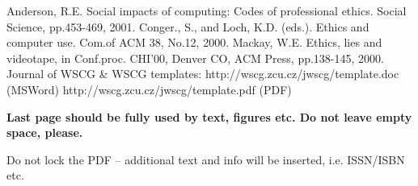 \documentclass[twoside,twocolumn,10pt]{article}
\begin{document}

\begin{thebibliography}{99}
\label{references}
 Anderson, R.E. Social impacts of computing: Codes of professional ethics. Social Science, pp.453-469, 2001.
 Conger., S., and Loch, K.D. (eds.). Ethics and computer use. Com.of ACM 38, No.12, 2000.
 Mackay, W.E. Ethics, lies and videotape, in Conf.proc. CHI'00, Denver CO, ACM Press, pp.138-145, 2000.
 Journal of WSCG \& WSCG templates: http://wscg.zcu.cz/jwscg/template.doc (MSWord)
http://wscg.zcu.cz/jwscg/template.pdf (PDF)
\end{thebibliography}

{\bfseries
Last page should be fully used by text, figures etc. Do not leave empty space, please. 

Do not lock the PDF -- additional text and info will be inserted, i.e. ISSN/ISBN etc. 
}
\end{document}
